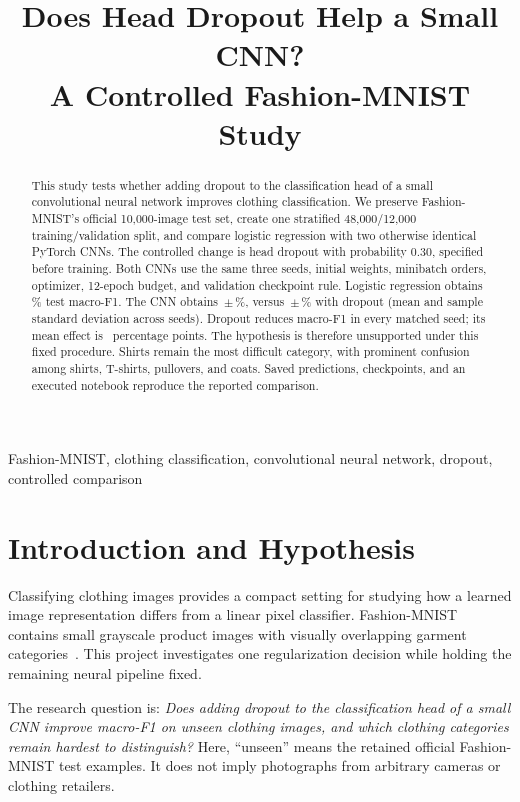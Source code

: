 \documentclass[conference]{IEEEtran}
\title{Does Head Dropout Help a Small CNN?\\A Controlled Fashion-MNIST Study}
\author{\IEEEauthorblockA{ROBT407: Machine Learning with Applications\\Nazarbayev University\\Team names and individual contributions pending completion}}
\begin{document}
\maketitle
\begin{abstract}
This study tests whether adding dropout to the classification head of a small convolutional neural network improves clothing classification. We preserve Fashion-MNIST's official 10,000-image test set, create one stratified 48,000/12,000 training/validation split, and compare logistic regression with two otherwise identical PyTorch CNNs. The controlled change is head dropout with probability 0.30, specified before training. Both CNNs use the same three seeds, initial weights, minibatch orders, optimizer, 12-epoch budget, and validation checkpoint rule. Logistic regression obtains \LogFone\% test macro-F1. The CNN obtains \PlainFone\,$\pm$\,\PlainFoneSD\%, versus \DropFone\,$\pm$\,\DropFoneSD\% with dropout (mean and sample standard deviation across seeds). Dropout reduces macro-F1 in every matched seed; its mean effect is \MeanDelta\ percentage points. The hypothesis is therefore unsupported under this fixed procedure. Shirts remain the most difficult category, with prominent confusion among shirts, T-shirts, pullovers, and coats. Saved predictions, checkpoints, and an executed notebook reproduce the reported comparison.
\end{abstract}
\begin{IEEEkeywords}
Fashion-MNIST, clothing classification, convolutional neural network, dropout, controlled comparison
\end{IEEEkeywords}

\section{Introduction and Hypothesis}
Classifying clothing images provides a compact setting for studying how a learned image representation differs from a linear pixel classifier. Fashion-MNIST contains small grayscale product images with visually overlapping garment categories~\cite{fashion,dataset}. This project investigates one regularization decision while holding the remaining neural pipeline fixed.

The research question is: \emph{Does adding dropout to the classification head of a small CNN improve macro-F1 on unseen clothing images, and which clothing categories remain hardest to distinguish?} Here, ``unseen'' means the retained official Fashion-MNIST test examples. It does not imply photographs from arbitrary cameras or clothing retailers.
\end{document}
